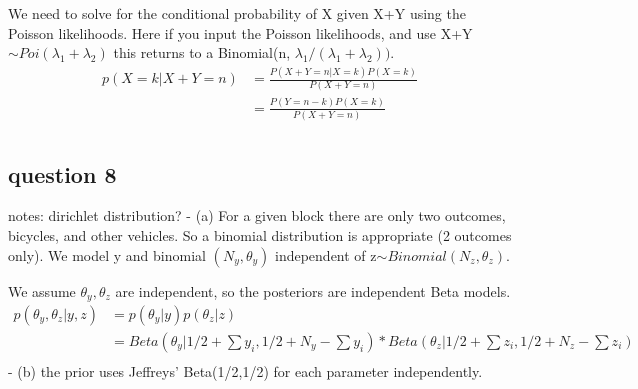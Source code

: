 \documentclass[
]{book}
\theoremstyle{definition}
\theoremstyle{definition}
\theoremstyle{definition}
\theoremstyle{definition}
\theoremstyle{remark}
\begin{document}
We need to solve for the conditional probability of X given X+Y using the Poisson likelihoods. Here if you input the Poisson likelihoods, and use X+Y \(\sim Poi(\lambda_1+\lambda_2)\) this returns to a Binomial(n, \(\lambda_1/(\lambda_1+\lambda_2))\).
\[
\begin{aligned}
p(X =k| X+Y=n) &= \frac{P(X+Y=n | X=k)P(X=k)}{P(X+Y=n)} \\
 &=  \frac{P(Y=n-k)P(X=k)}{P(X+Y=n)} \\
\end{aligned}
\]

\hypertarget{question-8}{%
\subsection*{question 8}\label{question-8}}

notes: dirichlet distribution?
- (a) For a given block there are only two outcomes, bicycles, and other vehicles. So a binomial distribution is appropriate (2 outcomes only). We model y and binomial \((N_y,\theta_y)\) independent of z\(\sim Binomial(N_z,\theta_z)\).

We assume \(\theta_y,\theta_z\) are independent, so the posteriors are independent Beta models.
\[
\begin{aligned}
p(\theta_y,\theta_z| y,z) &= p(\theta_y | y)p(\theta_z|z) \\
&= Beta(\theta_y  | 1/2 +\sum y_i, 1/2+N_y-\sum y_i)*Beta(\theta_z  | 1/2 +\sum z_i, 1/2+N_z-\sum z_i)\\
\end{aligned}
\]
- (b) the prior uses Jeffreys' Beta(1/2,1/2) for each parameter independently.
\end{document}
